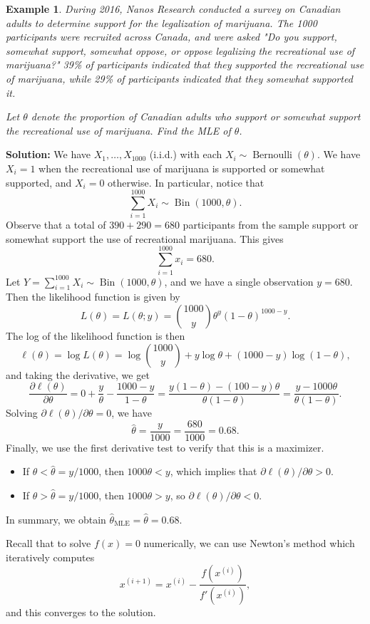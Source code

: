 \documentclass[10pt]{article}
\DeclareMathOperator{\Ber}{Bernoulli}
\DeclareMathOperator{\Bin}{Bin}
\DeclareMathOperator{\MLE}{MLE}
\theoremstyle{newstyle}
\newtheorem{exmp}[thm]{Example}
\begin{document}
\begin{exmp}  
During 2016, Nanos Research conducted a survey on Canadian adults to determine support 
for the legalization of marijuana. The 1000 participants were recruited across Canada, 
and were asked "Do you support, somewhat support, somewhat oppose, or oppose legalizing the 
recreational use of marijuana?" 39\% of participants indicated that they supported the 
recreational use of marijuana, while 29\% of participants indicated that they somewhat 
supported it. 

Let $\theta$ denote the proportion of Canadian adults who support or somewhat support the 
recreational use of marijuana. Find the MLE of $\theta$.
\end{exmp}
{\color{blue}
{\bf Solution:} We have $X_1, \dots, X_{1000}$ (i.i.d.) with each $X_i \sim \Ber(\theta)$. 
We have $X_i = 1$ when the recreational use of marijuana is supported or somewhat supported, 
and $X_i = 0$ otherwise. In particular, notice that 
\[ \sum_{i=1}^{1000} X_i \sim \Bin(1000, \theta). \]
Observe that a total of $390 + 290 = 680$ participants from the sample support or somewhat 
support the use of recreational marijuana. This gives 
\[ \sum_{i=1}^{1000} x_i = 680. \] 
Let $Y = \sum_{i=1}^{1000} X_i \sim \Bin(1000, \theta)$, and we have a single observation $y = 680$. 
Then the likelihood function is given by 
\[ L(\theta) = L(\theta; y) = \binom{1000}y \theta^y (1-\theta)^{1000-y}. \]
The log of the likelihood function is then 
\[ \ell(\theta) = \log L(\theta) = \log \binom{1000}y + y\log\theta + (1000-y)\log(1-\theta), \]
and taking the derivative, we get 
\[ \frac{\partial\ell(\theta)}{\partial\theta} = 0 + \frac{y}\theta - \frac{1000-y}{1-\theta} 
= \frac{y(1-\theta) - (100-y)\theta}{\theta(1-\theta)} = \frac{y - 1000\theta}{\theta(1-\theta)}. \]
Solving $\partial\ell(\theta)/\partial\theta = 0$, we have 
\[ \hat\theta = \frac{y}{1000} = \frac{680}{1000} = 0.68. \]
Finally, we use the first derivative test to verify that this is a maximizer. 
\begin{itemize}
    \item If $\theta < \hat\theta = y/1000$, then $1000\theta < y$, which implies that 
    $\partial\ell(\theta)/\partial\theta > 0$. 
    \item If $\theta > \hat\theta = y/1000$, then $1000\theta > y$, so 
    $\partial\ell(\theta)/\partial\theta < 0$.
\end{itemize}
In summary, we obtain $\hat\theta_{\MLE} = \hat\theta = 0.68$. 
}

Recall that to solve $f(x) = 0$ numerically, we can use Newton's method which iteratively computes
\[ x^{(i+1)} = x^{(i)} - \frac{f(x^{(i)})}{f'(x^{(i)})}, \]
and this converges to the solution.
\end{document}
